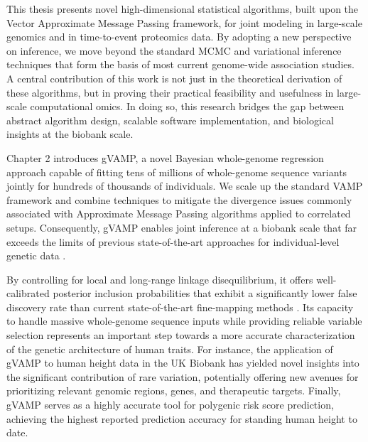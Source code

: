 This thesis presents novel high-dimensional statistical algorithms, built upon the Vector Approximate Message Passing framework, for joint modeling in large-scale genomics and in time-to-event proteomics data. By adopting a new perspective on inference, we move beyond the standard MCMC and variational inference techniques that form the basis of most current genome-wide association studies. A central contribution of this work is not just in the theoretical derivation of these algorithms, but in proving their practical feasibility and usefulness in large-scale computational omics. In doing so, this research bridges the gap between abstract algorithm design, scalable software implementation, and biological insights at the biobank scale.

Chapter 2 introduces gVAMP, a novel Bayesian whole-genome regression approach capable of fitting tens of millions of whole-genome sequence variants jointly for hundreds of thousands of individuals. We scale up the standard VAMP framework and combine techniques to mitigate the divergence issues commonly associated with Approximate Message Passing algorithms applied to correlated setups. Consequently, gVAMP enables joint inference at a biobank scale that far exceeds the limits of previous state-of-the-art approaches for individual-level genetic data \cite{regenie,Orliac2022}. 

By controlling for local and long-range linkage disequilibrium, it offers well-calibrated posterior inclusion probabilities that exhibit a significantly lower false discovery rate than current state-of-the-art fine-mapping methods \cite{susie,10.1093/bioinformatics/btw018}. Its capacity to handle massive whole-genome sequence inputs while providing reliable variable selection represents an important step towards a more accurate characterization of the genetic architecture of human traits. For instance, the application of gVAMP to human height data in the UK Biobank has yielded novel insights into the significant contribution of rare variation, potentially offering new avenues for prioritizing relevant genomic regions, genes, and therapeutic targets. Finally, gVAMP serves as a highly accurate tool for polygenic risk score prediction, achieving the highest reported prediction accuracy for standing human height to date. 

